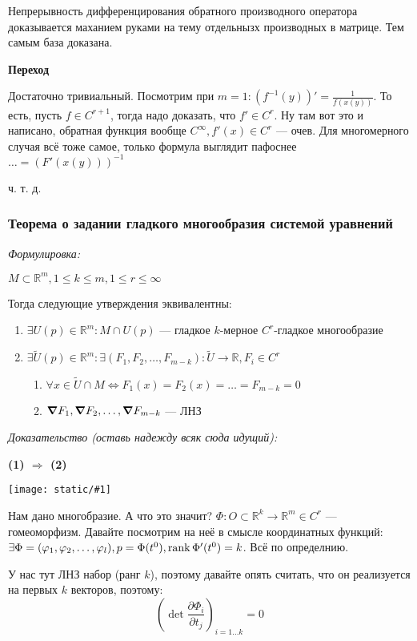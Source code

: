 \documentclass{article}
\def\image#1{\texttt{[image: static/\#1]}}
\begin{document}
Непрерывность дифференцирования обратного производного оператора доказывается маханием руками на тему отдельнызх производных в матрице. Тем самым база доказана.

\textbf{Переход}

Достаточно тривиальный. Посмотрим при $m = 1: (f^{-1}(y))' = \frac{1}{f(x(y))}$. То есть, пусть $f \in C^{r + 1}$, тогда надо доказать, что $f' \in C^r$. Ну там вот это и написано, обратная функция вообще $C^\infty, f'(x) \in C^r$ --- очев. Для многомерного случая всё тоже самое, только формула выглядит пафоснее $\ldots = (F'(x(y)))^{-1}$

ч. т. д.

\subsubsection{Теорема о задании гладкого многообразия системой уравнений}
\textit{Формулировка:}

$M \subset \mathbb{R}^m, 1 \le k \le m, 1 \le r \le \infty$

Тогда следующие утверждения эквивалентны:

\begin{enumerate}
    \item $\exists U(p) \in \mathbb{R}^m: M \cap U(p)$ --- гладкое $k$-мерное $C^r$-гладкое многообразие
    \item $\exists \widetilde{U}(p) \in \mathbb{R}^m: \exists (F_1, F_2, \ldots, F_{m - k}): \widetilde{U} \rightarrow \mathbb{R}, F_i \in C^r$ \begin{enumerate}
        \item $\forall x \in \widetilde{U} \cap M \Leftrightarrow F_1(x) = F_2(x) = \ldots = F_{m - k} = 0$
        \item $\grad F_1, \grad F_2, \ldots, \grad F_{m - k}$ --- ЛНЗ
    \end{enumerate}
\end{enumerate}
\textit{Доказательство (оставь надежду всяк сюда идущий):}

\textbf{(1) $\Rightarrow$ (2)}

\image{glad_mnogoobr.png}

Нам дано многобразие. А что это значит? $\Phi: O \subset \mathbb{R}^k \rightarrow \mathbb{R}^m \in C^r$ --- гомеоморфизм. Давайте посмотрим на неё в смысле координатных функций: $\exists \Phi = (\varphi_1, \varphi_2, \ldots, \varphi_l), p = \Phi(t^0), \rank \Phi'(t^0) = k$. Всё по определнию. 

У нас тут ЛНЗ набор (ранг $k$), поэтому давайте опять считать, что он реализуется на первых $k$ векторов, поэтому: 
\[\left(\det \frac{\partial \Phi_i}{\partial t_j}\right)_{i = 1 \ldots k} = 0\]
\end{document}
